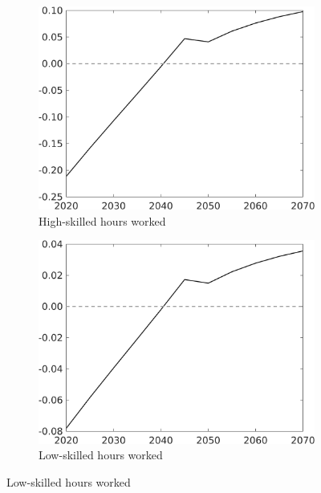 \begin{figure}[h!!!]
\begin{subfigure}{0.4\textwidth}
	\end{subfigure}	
	\begin{subfigure}{0.4\textwidth}
		\caption{High-skilled hours worked}
		\includegraphics[width=1\textwidth]{../../codding_model/own_basedOnFried/optimalPol_010922_revision/figures/all_13Sept22_Tplus30/CountTAUFPerDif_Opt_target_hh_nsk0_xgr0_knspil0_regime4_spillover0_sep0_extern0_PV1_etaa0.79.png}
	\end{subfigure}	
	\begin{subfigure}{0.4\textwidth}
		\caption{Low-skilled hours worked}
		\includegraphics[width=1\textwidth]{../../codding_model/own_basedOnFried/optimalPol_010922_revision/figures/all_13Sept22_Tplus30/CountTAUFPerDif_Opt_target_hl_nsk0_xgr0_knspil0_regime4_spillover0_sep0_extern0_PV1_etaa0.79.png}

\end{subfigure}
\end{figure}
